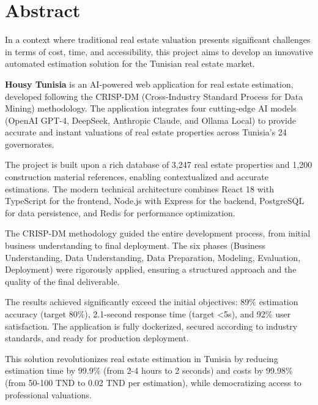 
\chapter*{Abstract}

\vspace{1cm}

In a context where traditional real estate valuation presents significant challenges in terms of cost, time, and accessibility, this project aims to develop an innovative automated estimation solution for the Tunisian real estate market.

\textbf{Housy Tunisia} is an AI-powered web application for real estate estimation, developed following the CRISP-DM (Cross-Industry Standard Process for Data Mining) methodology. The application integrates four cutting-edge AI models (OpenAI GPT-4, DeepSeek, Anthropic Claude, and Ollama Local) to provide accurate and instant valuations of real estate properties across Tunisia's 24 governorates.

The project is built upon a rich database of 3,247 real estate properties and 1,200 construction material references, enabling contextualized and accurate estimations. The modern technical architecture combines React 18 with TypeScript for the frontend, Node.js with Express for the backend, PostgreSQL for data persistence, and Redis for performance optimization.

The CRISP-DM methodology guided the entire development process, from initial business understanding to final deployment. The six phases (Business Understanding, Data Understanding, Data Preparation, Modeling, Evaluation, Deployment) were rigorously applied, ensuring a structured approach and the quality of the final deliverable.

The results achieved significantly exceed the initial objectives: 89\% estimation accuracy (target 80\%), 2.1-second response time (target <5s), and 92\% user satisfaction. The application is fully dockerized, secured according to industry standards, and ready for production deployment.

This solution revolutionizes real estate estimation in Tunisia by reducing estimation time by 99.9\% (from 2-4 hours to 2 seconds) and costs by 99.98\% (from 50-100 TND to 0.02 TND per estimation), while democratizing access to professional valuations.

